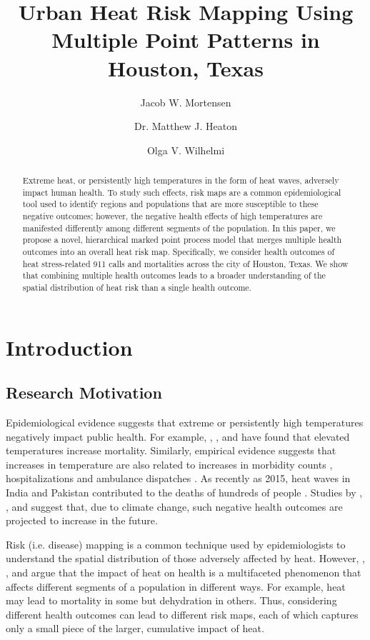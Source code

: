 \documentclass[final]{statsoc}
\title[Risk Mapping - Multiple Point Patterns]{Urban Heat Risk Mapping Using Multiple Point Patterns in Houston, Texas}
\author{Jacob W. Mortensen}
\author[Heaton]{Dr. Matthew J. Heaton}
\author[Mortensen, Heaton \& Wilhelmi]{Olga V. Wilhelmi}
\begin{document}
\begin{abstract}
Extreme heat, or persistently high temperatures in the form of heat waves,
adversely impact human health. To study such effects, risk maps are a common
epidemiological tool used to identify regions and populations that are
more susceptible to these negative outcomes; however, the negative health 
effects of high temperatures are manifested differently among
different segments of the population. In this paper, we propose a novel,
hierarchical marked point process model that merges multiple health outcomes
into an overall heat risk map. Specifically, we consider health outcomes of  heat stress-related 911 calls and mortalities across the city of Houston, Texas. We show that combining multiple health outcomes leads to a broader
understanding of the spatial distribution of heat risk than a single 
health outcome.
\end{abstract}

\section{Introduction}
\subsection{Research Motivation}
Epidemiological evidence suggests that extreme or persistently high
temperatures negatively impact public health. For example, \cite{Basu2002},
\cite{Gosling2009}, \cite{Anderson2011} and \cite{Gasparrini2011}
have found that elevated temperatures increase mortality. Similarly,
empirical evidence suggests that increases in temperature are also 
related to increases in morbidity counts \citep{Li2012}, hospitalizations
\citep{Rusticucci2002,Schaffer2012} and ambulance
dispatches \citep{Ng2014}. As recently as 2015, heat waves in India 
and Pakistan contributed to the deaths of hundreds of people \citep{Mohsin2015}.
Studies by \cite{Luber2008}, \cite{Meehl2004}, \cite{Nicholls2009} and
\cite{Peng2011} suggest that, due to climate change, such negative
health outcomes are projected to increase in the future.

Risk (i.e. disease) mapping \citep{Lawson2013} is a common technique
used by epidemiologists to understand the spatial distribution
of those adversely affected by heat. However, \cite{Wilhelmi2010},
\cite{Wolf2010}, \cite{Uejio2011} and \cite{Heaton2014}
argue that the impact of heat on health is a multifaceted phenomenon that affects different 
segments of a population in different ways. For example, heat may lead to mortality
in some but dehydration in others. Thus, considering different health
outcomes can lead to different risk maps, each of which captures only a small
piece of the larger, cumulative impact of heat.
\end{document}
